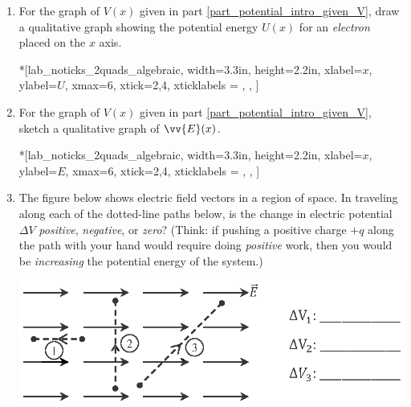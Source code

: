 \begin{enumerate}[labparts]
\item For the graph of $V(x)$ given in part \ref{part_potential_intro_given_V}, draw a qualitative graph showing the potential energy  $U(x)$ for an \textit{electron} placed on the $x$ axis.
\begin{lab_axis}*[lab_noticks_2quads_algebraic,
	width={3.3in}, height={2.2in},
	xlabel={$x$},
	ylabel={$U$},
	xmax={6},
	xtick={2,4},
	xticklabels = { , },
	]
\end{lab_axis}

\item  For the graph of $V(x)$ given in part \ref{part_potential_intro_given_V}, sketch a qualitative graph of $\vv{E}(x)$.

\begin{lab_axis}*[lab_noticks_2quads_algebraic,
	width={3.3in}, height={2.2in},
	xlabel={$x$},
	ylabel={$E$},
	xmax={6},
	xtick={2,4},
	xticklabels = { , },
	]
\end{lab_axis}

\pagebreak[3]
\item The figure below shows electric field vectors in a region of space.  In traveling  along each of the dotted-line paths below, is the change in electric potential $\Delta V$ \textit{positive},  \textit{negative}, or  \textit{zero}?  (Think: if pushing a positive charge $+q$ along the path with your hand would require doing \textit{positive} work, then you would  be \textit{increasing} the potential energy of the system.)
\begin{center}
\vspace{-0.1 in}
\includegraphics{potential_intro/activity_5_figs/uniform_E_field_1.eps}
\end{center}


\end{enumerate}
